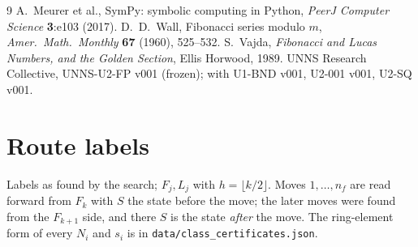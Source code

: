 \documentclass[11pt]{article}
\theoremstyle{definition}
\theoremstyle{remark}
\begin{document}
\begin{thebibliography}{9}
 A.~Meurer et al., SymPy: symbolic computing in Python, \emph{PeerJ Computer Science} \textbf{3}:e103 (2017).
 D.~D.~Wall, Fibonacci series modulo $m$, \emph{Amer.\ Math.\ Monthly} \textbf{67} (1960), 525--532.
 S.~Vajda, \emph{Fibonacci and Lucas Numbers, and the Golden Section}, Ellis Horwood, 1989.
 UNNS Research Collective, UNNS-U2-FP v001 (frozen); with U1-BND v001, U2-001 v001, U2-SQ v001.
\end{thebibliography}

\appendix
\section{Route labels}
Labels as found by the search; $F_j,L_j$ with $h=\lfloor k/2\rfloor$. Moves $1,\dots,n_f$ are read forward from $F_k$ with $S$ the state before the move; the later moves were found from the $F_{k+1}$ side, and there $S$ is the state \emph{after} the move. The ring-element form of every $N_i$ and $s_i$ is in \texttt{data/class\_certificates.json}.
\small\renewcommand{\arraystretch}{1.35}

\end{document}
